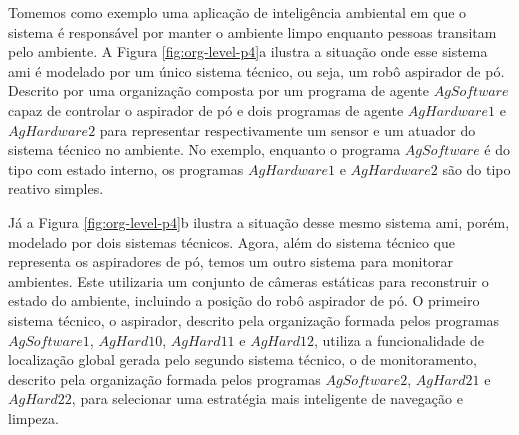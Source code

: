     \begin{figure}[h!]
        \centering
    \end{figure}
    
    Tomemos como exemplo uma aplicação de inteligência ambiental em que o sistema é responsável por manter o ambiente limpo enquanto pessoas transitam pelo ambiente. A Figura \ref{fig:org-level-p4}a ilustra a situação onde esse sistema \acrshort{ami} é modelado por um único sistema técnico, ou seja, um robô aspirador de pó. Descrito por uma organização composta por um programa de agente $AgSoftware$ capaz de controlar o aspirador de pó e dois programas de agente $AgHardware1$ e $AgHardware2$ para representar respectivamente um sensor e um atuador do sistema técnico no ambiente. No exemplo, enquanto o programa $AgSoftware$ é do tipo com estado interno, os programas $AgHardware1$ e $AgHardware2$ são do tipo reativo simples.
    
    Já a Figura \ref{fig:org-level-p4}b ilustra a situação desse mesmo sistema \acrshort{ami}, porém, modelado por dois sistemas técnicos. Agora, além do sistema técnico que representa os aspiradores de pó, temos um outro sistema para monitorar ambientes. Este utilizaria um conjunto de câmeras estáticas para reconstruir o estado do ambiente, incluindo a posição do robô aspirador de pó. O primeiro sistema técnico, o aspirador, descrito pela organização formada pelos programas $AgSoftware1$, $AgHard10$, $AgHard11$ e $AgHard12$, utiliza a funcionalidade de localização global gerada pelo segundo sistema técnico, o de monitoramento, descrito pela organização formada pelos programas $AgSoftware2$, $AgHard21$ e $AgHard22$, para selecionar uma estratégia mais inteligente de navegação e limpeza.
    
